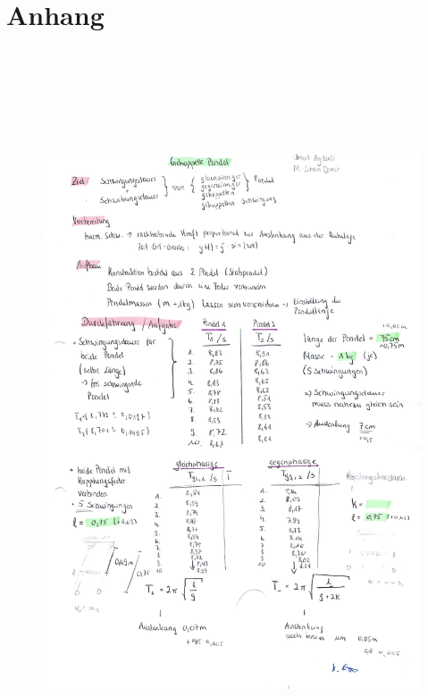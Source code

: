 \section{Anhang}


\begin{figure}
    \centering
    \includegraphics[height=22cm]{bilder/1.jpg}
\end{figure}



